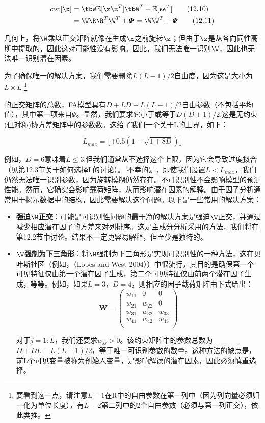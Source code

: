 \documentclass[a4paper]{article}
\begin{document}
\begin{align}
cov[\x]&=\tbW\mathbb{E}[\z\z^T]\tbW^T+\mathbb{E}[\boldsymbol{\epsilon}\boldsymbol{\epsilon}^T]\tag{12.10}\\
&=\W\R\R^T\W^T+\boldsymbol{\varPsi}=\W\W^T+\boldsymbol{\varPsi}\tag{12.11}
\end{align}

几何上，将$\W$乘以正交矩阵就像在生成$\x$之前旋转$\z$；但由于$\z$是从各向同性高斯中提取的，因此这对可能性没有影响。因此，我们无法唯一识别$\W$，因此也无法唯一识别潜在因素。 

为了确保唯一的解决方案，我们需要删除$L(L-1)/2$自由度，因为这是大小为$L \times L$
\footnote{要看到这一点，请注意$L-1$在R中的自由参数在第一列中（因为列向量必须归一化为单位长度），有$L-2$第二列中的2个自由参数（必须与第一列正交），依此类推。 }

的正交矩阵的总数，FA模型具有$D+LD-L(L-1)/2$自由参数（不包括平均值），其中第一项来自$\boldsymbol{\varPsi}$。显然，我们要求它小于或等于$D(D+1)/2$,这是无约束(但对称)协方差矩阵中的参数数。这给了我们一个关于L的上界，如下：

\begin{equation}
	L_{max}=\lfloor+0.5(1-\sqrt{1+8D})\rfloor\tag{12.12}
\end{equation}

例如，$D=6$意味着$L\leqslant3$.但我们通常从不选择这个上限，因为它会导致过度拟合（见第12.3节关于如何选择L的讨论）。 
不幸的是，即使我们设置$L<L_{max}$，我们仍然无法唯一识别参数，因为旋转模糊仍然存在。不可识别性不会影响模型的预测性能。然而，它确实会影响载荷矩阵，从而影响潜在因素的解释。由于因子分析通常用于揭示数据中的结构，因此需要解决这个问题。以下是一些常用的解决方案： 

\begin{itemize}
\item \textbf{强迫$\W$正交}：可能是可识别性问题的最干净的解决方案是强迫$\W$正交，并通过减少相应潜在因子的方差来对列排序。这是主成分分析采用的方法，我们将在第12.2节中讨论。结果不一定更容易解释，但至少是独特的。 
\item \textbf{$\W$强制为下三角形}：将$\W$强制为下三角形是实现可识别性的一种方法，这在贝叶斯社区（例如，（Lopes and West 2004））中很流行，其目的是确保第一个可见特征仅由第一个潜在因子生成，第二个可见特征仅由前两个潜在因子生成，等等。例如，如果$L=3，D=4$，则相应的因子载荷矩阵由下式给出： 
\[ \mathbf{W} = \left(
\begin{array}{cccc}
w_{11} & 0  & 0\\
w_{21} & w_{22}  & 0\\
w_{31} & w_{32} &  w_{33}\\
w_{41} & w_{42} &  w_{43}\\ \tag{12.13}
\end{array} \right) \]

对于$j=1:L$，我们还要求$w_{jj}>0$。该约束矩阵中的参数总数为$D+DL-L(L-1)/2$，等于唯一可识别参数的数量。这种方法的缺点是，前L个可见变量被称为创始人变量，是影响解读的潜在因素，因此必须慎重选择。 
\end{itemize}
\end{document}
